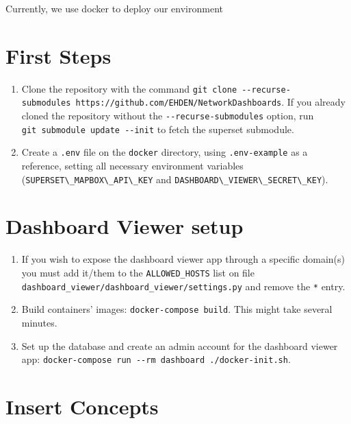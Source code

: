 \documentclass[
]{book}
\begin{document}
Currently, we use docker to deploy our environment

\hypertarget{first-steps}{%
\section{First Steps}\label{first-steps}}

\begin{enumerate}
\def\labelenumi{\arabic{enumi}.}
\item
  Clone the repository with the command \texttt{git\ clone\ -\/-recurse-submodules\ https://github.com/EHDEN/NetworkDashboards}. If you already cloned the repository without the \texttt{-\/-recurse-submodules} option, run \texttt{git\ submodule\ update\ -\/-init} to fetch the superset submodule.
\item
  Create a \texttt{.env} file on the \texttt{docker} directory, using \texttt{.env-example} as a reference, setting all necessary environment variables (\texttt{SUPERSET\textbackslash{}\_MAPBOX\textbackslash{}\_API\textbackslash{}\_KEY} and \texttt{DASHBOARD\textbackslash{}\_VIEWER\textbackslash{}\_SECRET\textbackslash{}\_KEY}).
\end{enumerate}

\hypertarget{dashboard-viewer-setup}{%
\section{Dashboard Viewer setup}\label{dashboard-viewer-setup}}

\begin{enumerate}
\def\labelenumi{\arabic{enumi}.}
\item
  If you wish to expose the dashboard viewer app through a specific domain(s) you must add it/them to the \texttt{ALLOWED\_HOSTS} list on file \texttt{dashboard\_viewer/dashboard\_viewer/settings.py} and remove the \texttt{\textquotesingle{}*\textquotesingle{}} entry.
\item
  Build containers' images: \texttt{docker-compose\ build}. This might take several minutes.
\item
  Set up the database and create an admin account for the dashboard viewer app: \texttt{docker-compose\ run\ -\/-rm\ dashboard\ ./docker-init.sh}.
\end{enumerate}

\hypertarget{insert-concepts}{%
\section{Insert Concepts}\label{insert-concepts}}
\end{document}
